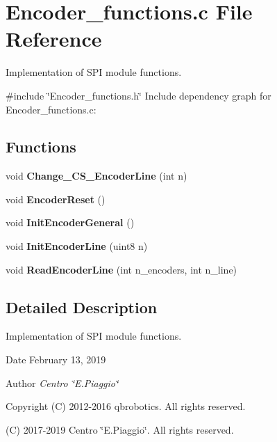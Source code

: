 \section{Encoder\+\_\+functions.\+c File Reference}
\label{_encoder__functions_8c}


Implementation of S\+PI module functions.  


{\ttfamily \#include \char`\"{}Encoder\+\_\+functions.\+h\char`\"{}}\newline
Include dependency graph for Encoder\+\_\+functions.\+c\+:
\subsection*{Functions}
\begin{DoxyCompactItemize}
\item 
\mbox{\label{_encoder__functions_8c_a22b528bf1b9a7a0a86b618d7195b106b}} 
void {\bfseries Change\+\_\+\+C\+S\+\_\+\+Encoder\+Line} (int n)
\item 
\mbox{\label{_encoder__functions_8c_a1f711fe1ef258ba1b0d90cbce8a0e645}} 
void {\bfseries Encoder\+Reset} ()
\item 
\mbox{\label{_encoder__functions_8c_a2ee4a1ed078be27aa04157f035933a2f}} 
void {\bfseries Init\+Encoder\+General} ()
\item 
\mbox{\label{_encoder__functions_8c_aa7dd2ab5bc6e906d2b1baa3dcf030197}} 
void {\bfseries Init\+Encoder\+Line} (uint8 n)
\item 
\mbox{\label{_encoder__functions_8c_af23a5b3c809698c750feda90e24f85fe}} 
void {\bfseries Read\+Encoder\+Line} (int n\+\_\+encoders, int n\+\_\+line)
\end{DoxyCompactItemize}


\subsection{Detailed Description}
Implementation of S\+PI module functions. 

\begin{DoxyDate}{Date}
February 13, 2019 
\end{DoxyDate}
\begin{DoxyAuthor}{Author}
{\itshape Centro \char`\"{}\+E.\+Piaggio\char`\"{}} 
\end{DoxyAuthor}
\begin{DoxyCopyright}{Copyright}
(C) 2012-\/2016 qbrobotics. All rights reserved. 

(C) 2017-\/2019 Centro \char`\"{}\+E.\+Piaggio\char`\"{}. All rights reserved. 
\end{DoxyCopyright}
